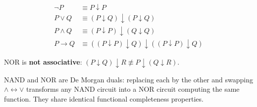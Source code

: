 \begin{remark}
\begin{align*}
\neg P &\equiv P \downarrow P \\
P \vee Q &\equiv (P \downarrow Q) \downarrow (P \downarrow Q) \\
P \wedge Q &\equiv (P \downarrow P) \downarrow (Q \downarrow Q) \\
P \rightarrow Q &\equiv ((P \downarrow P) \downarrow Q) \downarrow ((P \downarrow P) \downarrow Q)
\end{align*}
\end{remark}

\begin{proposition}
\label{prop:nor-complete}
NOR is \textbf{not associative}: $(P \downarrow Q) \downarrow R \not\equiv P \downarrow (Q \downarrow R)$.
\end{proposition}

\begin{remark}
NAND and NOR are De Morgan duals: replacing each by the other and swapping
$\wedge \leftrightarrow \vee$ transforms any NAND circuit into a NOR circuit
computing the same function. They share identical functional completeness
properties.
\end{remark}
